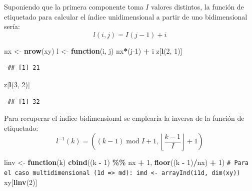 \documentclass[
  spanish,
  10pt,
]{book}
\newenvironment{Shaded}{\begin{snugshade}}{\end{snugshade}}
\newcommand{\CommentTok}[1]{\textcolor[rgb]{0.56,0.35,0.01}{\textit{#1}}}
\newcommand{\ControlFlowTok}[1]{\textcolor[rgb]{0.13,0.29,0.53}{\textbf{#1}}}
\newcommand{\DecValTok}[1]{\textcolor[rgb]{0.00,0.00,0.81}{#1}}
\newcommand{\FunctionTok}[1]{\textcolor[rgb]{0.13,0.29,0.53}{\textbf{#1}}}
\newcommand{\NormalTok}[1]{#1}
\newcommand{\OtherTok}[1]{\textcolor[rgb]{0.56,0.35,0.01}{#1}}
\newcommand{\SpecialCharTok}[1]{\textcolor[rgb]{0.81,0.36,0.00}{\textbf{#1}}}
\theoremstyle{break}
\theoremstyle{nonumberplain}
\renewcommand{\CommentTok}[1]{\textcolor[rgb]{0.41,0.41,0.41}{\texttt{#1}}}
\begin{document}
Suponiendo que la primera componente toma \(I\) valores distintos, la función de etiquetado para calcular el índice unidimensional a partir de uno bidimensional sería:
\[l(i, j) = I(j-1) + i\]

\begin{Shaded}
\begin{Highlighting}[]
\NormalTok{nx }\OtherTok{\textless{}{-}} \FunctionTok{nrow}\NormalTok{(xy)}
\NormalTok{l }\OtherTok{\textless{}{-}} \ControlFlowTok{function}\NormalTok{(i, j) nx}\SpecialCharTok{*}\NormalTok{(j}\DecValTok{{-}1}\NormalTok{) }\SpecialCharTok{+}\NormalTok{ i}
\NormalTok{z[}\FunctionTok{l}\NormalTok{(}\DecValTok{2}\NormalTok{, }\DecValTok{1}\NormalTok{)]}
\end{Highlighting}
\end{Shaded}

\begin{verbatim}
 ## [1] 21
\end{verbatim}

\begin{Shaded}
\begin{Highlighting}[]
\NormalTok{z[}\FunctionTok{l}\NormalTok{(}\DecValTok{3}\NormalTok{, }\DecValTok{2}\NormalTok{)]}
\end{Highlighting}
\end{Shaded}

\begin{verbatim}
 ## [1] 32
\end{verbatim}

Para recuperar el índice bidimensional se emplearía la inversa de la función de etiquetado:
\[l^{-1}( k ) = \left(  (k -1) \operatorname{mod} I  + 1, \left\lfloor \frac{k - 1}{I}\right\rfloor + 1\right)\]

\begin{Shaded}
\begin{Highlighting}[]
\NormalTok{linv }\OtherTok{\textless{}{-}} \ControlFlowTok{function}\NormalTok{(k) }\FunctionTok{cbind}\NormalTok{((k }\SpecialCharTok{{-}} \DecValTok{1}\NormalTok{) }\SpecialCharTok{\%\%}\NormalTok{ nx }\SpecialCharTok{+} \DecValTok{1}\NormalTok{, }\FunctionTok{floor}\NormalTok{((k }\SpecialCharTok{{-}} \DecValTok{1}\NormalTok{)}\SpecialCharTok{/}\NormalTok{nx) }\SpecialCharTok{+} \DecValTok{1}\NormalTok{)}
\CommentTok{\# Para el caso multidimensional (1d =\textgreater{} md): imd \textless{}{-} arrayInd(i1d, dim(xy))}
\NormalTok{xy[}\FunctionTok{linv}\NormalTok{(}\DecValTok{2}\NormalTok{)]}
\end{Highlighting}
\end{Shaded}
\end{document}
